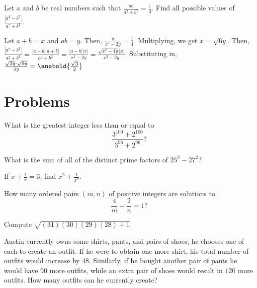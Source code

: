 \documentclass[mast]{lucky}
\begin{document}
\begin{exam}
Let $a$ and $b$ be real numbers such that $\frac{ab}{a^2+b^2}=\frac{1}{4}$. Find all possible values of $\frac{|a^2-b^2|}{a^2+b^2}$.
\end{exam}

\begin{sol}
Let $a+b=x$ and $ab=y$. Then, $\frac{y}{x^2-2y}=\frac{1}{4}$. Multiplying, we get $x=\sqrt{6y}$. Then, $\frac{|a^2-b^2|}{a^2+b^2}=\frac{|a-b||a+b|}{a^2+b^2}=\frac{|a-b||x|}{x^2-2y}=\frac{\sqrt{x^2-4y}|x|}{x^2-2y}$. Substituting in,$\frac{\sqrt{2y}\cdot \sqrt{6y}}{4y}=\ansbold{\frac{\sqrt{3}}{2}}$
\end{sol}


\pagebreak\section{Problems}



\begin{prob}[AMC 10A 2018/14]{2}
What is the greatest integer less than or equal to\[\frac{3^{100}+2^{100}}{3^{96}+2^{96}}?\]
\end{prob}

\begin{prob}{2}
What is the sum of all of the distinct prime factors of $25^3 - 27^2$?
\end{prob}

\begin{prob}[Classical]{2}
If $x+\frac{1}{x} = 3$, find $x^2+\frac{1}{x^2}$.
\end{prob}

\begin{prob}[AHMSE 1993/19]{2}
How many ordered pairs $(m,n)$ of positive integers are solutions to
\[\frac{4}{m}+\frac{2}{n}=1?\]
\end{prob}

\begin{prob}[1989 AIME/1]{2}
Compute $\sqrt{(31)(30)(29)(28)+1}$.
\end{prob}

\begin{prob}[2008-2009 Mandelbrot]{3}
Austin currently owns some shirts, pants, and pairs of shoes; he chooses one of each to create an outfit. If he were to obtain one more shirt, his total number of outfits would increase by $48.$ Similarly, if he bought another pair of pants he would have $90$ more outfits, while an extra pair of shoes would result in $120$ more outfits. How many outfits can he currently create?
\end{prob}
  
\end{document}
